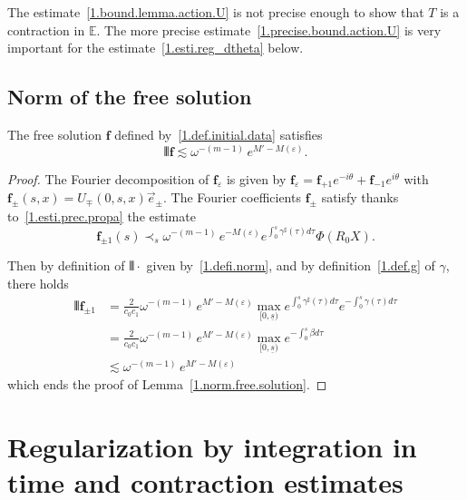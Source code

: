 \documentclass[AHL,Unicode,longabstracts,published]{cedram}
\theoremstyle{plain}
\newcommand*\e{\varepsilon}
\newcommand*\EE{{\mathbb E}}
\newcommand*\g{\gamma}
\newcommand*\f{{\mathbf f}}
\newcommand*\dsp{\displaystyle}
\newcommand*\und{\underline}
\DeclarePairedDelimiter{\VERT}{|\mkern -1.6mu|\mkern -1.6mu|}{|\mkern -1.6mu|\mkern -1.6mu|}
\begin{document}
\begin{rema}
The estimate~\eqref{1.bound.lemma.action.U} is not precise enough to show that $T$ is a contraction in $\EE$. The more precise estimate~\eqref{1.precise.bound.action.U} is very important for the estimate~\eqref{1.esti.reg_dtheta} below.
\end{rema}



\subsection{Norm of the free solution}

\begin{lemm}\label{1.lemma.norm.free.solution}
The free solution $\f$ defined by~\eqref{1.def.initial.data} satisfies
\begin{equation}\label{1.norm.free.solution}
\VERT{\f} \lesssim \omega^{-(m-1)}\,e^{M'-M(\e)}.
\end{equation}
\end{lemm}

\begin{proof}
The Fourier decomposition of $\f_{\e}$ is given by $\f_{\e} = \f_{+1}e^{-i\theta} + \f_{-1}e^{i\theta}$ with $ \f_{\pm}(s,x) = U_{\mp}(0,s,x)\vec{e}_{\pm} $. The Fourier coefficients $\f_{\pm}$ satisfy thanks to~\eqref{1.esti.prec.propa} the estimate
\begin{equation}\label{1.estimate.f.pm1}
\f_{\pm 1}(s) \prec_{s} \omega^{-(m-1)}\,e^{-M(\e)}e^{ \int_{0}^{s} \g^{\sharp}(\tau) d\tau } \Phi(R_0 X).
\end{equation}


Then by definition of $\VERT{\cdot}$ given by~\eqref{1.defi.norm}, and by definition~\eqref{1.def.g} of $\g$, there holds
\begin{align*}
\VERT{\f_{\pm 1}} & = \frac{\dsp 2}{\dsp c_0c_1} \omega^{-(m-1)}\,e^{M'-M(\e)} \max_{[0,\und{s})} e^{ \int_{0}^{s} \g^{\sharp}(\tau) d\tau}e^{- \int_{0}^{s} \g(\tau) d\tau} \\
& = \frac{\dsp 2}{\dsp c_0c_1} \omega^{-(m-1)}\,e^{M'-M(\e)} \max_{[0,\und{s})} e^{- \int_{0}^{s} \beta d\tau} \\
& \lesssim \omega^{-(m-1)}\,e^{M'-M(\e)}
\end{align*}
which ends the proof of Lemma~\ref{1.norm.free.solution}.
\end{proof}



\section{Regularization by integration in time and contraction estimates}\label{1.section.contraction}
\end{document}
